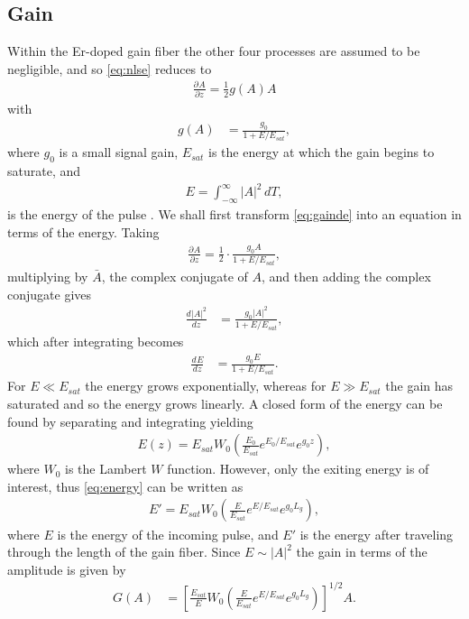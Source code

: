 \documentclass[12pt]{article}
\newcommand{\diff}[3][]{\frac{d^{#1}#2}{d{#3}^{#1}}}
\newcommand{\pdiff}[3][]{\frac{\partial^{#1}#2}{\partial{#3}^{#1}}}
\newcommand{\Es}{E_{sat}}
\begin{document}
\subsection{Gain}
Within the Er-doped gain fiber the other four processes are assumed to be negligible, and so \eqref{eq:nlse} reduces to
\begin{align}
\label{eq:gainde}
\pdiff{A}{z} = \frac{1}{2} g(A) A
\end{align}
with
\begin{align*}
g(A) &= \frac{g_0}{1 + E / \Es},
\end{align*}
where $g_0$ is a small signal gain, $\Es$ is the energy at which the gain begins to saturate, and \begin{align*}
E = \int_{-\infty}^\infty |A|^2 \, dT,
\end{align*}
is the energy of the pulse \cite{bohun, burgoyne2014, shtyrina, silfvast, yarutkina}. We shall first transform \eqref{eq:gainde} into an equation in terms of the energy. Taking
\begin{align*}
\pdiff{A}{z} = \frac{1}{2} \cdot \frac{g_0 A}{1 + E / \Es},
\end{align*}
multiplying by $\bar{A}$, the complex conjugate of $A$, and then adding the complex conjugate gives
\begin{align*}
\diff{|A|^2}{z} &= \frac{g_0 |A|^2}{1 + E / \Es},
\end{align*}
which after integrating becomes
\begin{align*}
\diff{E}{z} &= \frac{g_0 E}{1 + E / \Es}.
\end{align*}
For $E \ll \Es$ the energy grows exponentially, whereas for $E \gg \Es$ the gain has saturated and so the energy grows linearly. A closed form of the energy can be found by separating and integrating yielding
\begin{align}
\label{eq:energy}
E(z) = \Es W_0 \left( \frac{E_0}{\Es} e^{E_0 / \Es} e^{g_0 z} \right),
\end{align}
where $W_0$ is the Lambert $W$ function. However, only the exiting energy is of interest, thus \eqref{eq:energy} can be written as
\begin{align*}
E' = \Es W_0 \left( \frac{E}{\Es} e^{E / \Es} e^{g_0 L_g} \right),
\end{align*}
where $E$ is the energy of the incoming pulse, and $E'$ is the energy after traveling through the length of the gain fiber. Since $E \sim |A|^2$ the gain in terms of the amplitude is given by
\begin{align}
\label{eq:gain}
G(A) &= \left[ \frac{\Es}{E} W_0 \left( \frac{E}{\Es} e^{E / \Es} e^{g_0 L_g} \right) \right]^{1/2} A.
\end{align}
\end{document}

